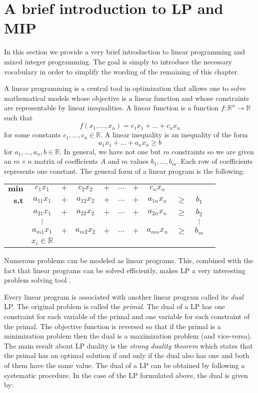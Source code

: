 \section{A brief introduction to LP and MIP}

In this section we provide a very brief introduction to linear programming and mixed integer programming.
The goal is simply to introduce the necessary vocabulary in order to simplify the wording of the remaining
of this chapter.

A linear programming is a central tool in optimization that allows one to solve mathematical models whose objective
is a linear function and whose constraints are representable by linear inequalities. A linear function is a function
$f : \mathbb{R}^n \rightarrow \mathbb{R}$ such that
$$
f(x_1, \ldots, x_n) = c_1 x_1 + \dots + c_n x_n 
$$
for some constants $c_1, \ldots, c_n \in \mathbb{R}$. A linear inequality is an inequality of the form
$$
a_1 x_1 + \ldots + a_n x_n \geq b
$$
for $a_1, \ldots, a_n, b \in \mathbb{R}$. In general, we have not one but $m$ constraints so we are given an $m \times n$ matrix of 
coefficients $A$ and $m$ values $b_1, \ldots, b_m$. Each row of coefficients represents one constant. The general form of a linear program is the following:

\begin{center}
\begin{tabular}{rcccccccccc}
$\displaystyle \mathbf{min}$ & $c_1 x_1$ & $+$ & $c_2 x_2$ & $+$ & $\ldots$ & $+$ & $c_n x_n$ & & \\
\textbf{s.t} & $a_{11} x_1$ & $+$ & $a_{12} x_2$ & $+$ & $\ldots$ & $+$ & $a_{1n} x_n$ & $\geq$ & $b_1$ \\
             & $a_{21} x_1$ & $+$ & $a_{22} x_2$ & $+$ & $\ldots$ & $+$ & $a_{2n} x_n$ & $\geq$ & $b_2$ \\
             & $\vdots$ & & & & & & & & $\vdots$ \\
             & $a_{m1} x_1$ & $+$ & $a_{m2} x_2$ & $+$ & $\ldots$ & $+$ & $a_{mn} x_n$ & $\geq$ & $b_m$ \\[0.2cm]
& $x_i \in \mathbb{R}$ & & & & & & & &
\end{tabular}
\end{center}

Numerous problems can be modeled as linear programs. This, combined with the fact that linear programs can be solved efficiently,
makes LP a very interesting problem solving tool \cite{lp1, lp2}.

Every linear program is associated with another linear program called its \emph{dual} LP. The original problem is called the \emph{primal}.
The dual of a LP has one constraint for each variable of the primal and one variable for each constraint of the primal. The objective function
is reversed so that if the primal is a minimization problem then the dual is a maximization problem (and vice-versa). The main result
about LP duality is the \emph{strong duality theorem} \cite{lp3} which states that the primal has an optimal solution if and only if the dual also has one 
and both of them have the same value. The dual of a LP can be obtained by following a systematic procedure. In the case of the LP formulated above,
the dual is given by:

